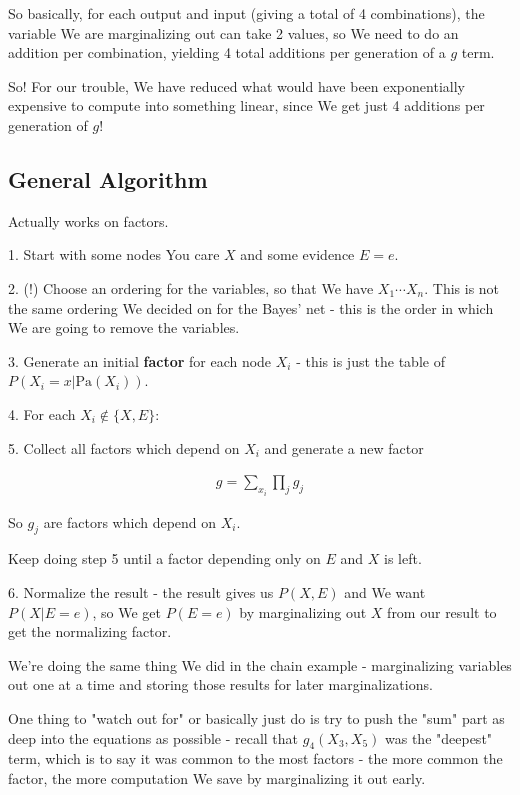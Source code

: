 \documentclass{article}
\begin{document}
		So basically, for each output and input (giving a total of 4 combinations), the variable We are marginalizing out can take 2 values, so We need to do an addition per combination, yielding 4 total additions per generation of a $g$ term. 
		
		So! For our trouble, We have reduced what would have been exponentially expensive to compute into something linear, since We get just 4 additions per generation of $g$!
		
	\subsection{General Algorithm}
	
		Actually works on factors.
		
		1. Start with some nodes You care $X$ and some evidence $E=e$.
		
		2. (!) Choose an ordering for the variables, so that We have $X_1\cdots X_n$. This is not the same ordering We decided on for the Bayes' net - this is the order in which We are going to remove the variables.
		
		3. Generate an initial \textbf{factor} for each node $X_i$ - this is just the table of $P(X_i=x|\text{Pa}(X_i))$.
		
		4. For each $X_i\not\in \{X, E \}$:
		
		5. Collect all factors which depend on $X_i$ and generate a new factor 
		
		\begin{align}
			g = \sum_{x_i}\prod_j g_j
		\end{align}
		
		So $g_j$ are factors which depend on $X_i$.
		
		Keep doing step 5 until a factor depending only on $E$ and $X$ is left.
		
		6. Normalize the result - the result gives us $P(X, E)$ and We want $P(X|E=e)$, so We get $P(E=e)$ by marginalizing out $X$ from our result to get the normalizing factor.
		
		We're doing the same thing We did in the chain example - marginalizing variables out one at a time and storing those results for later marginalizations.
		
		One thing to "watch out for" or basically just do is try to push the "sum" part as deep into the equations as possible - recall that $g_4(X_3, X_5)$ was the "deepest" term, which is to say it was common to the most factors - the more common the factor, the more computation We save by marginalizing it out early.
		
\end{document}
